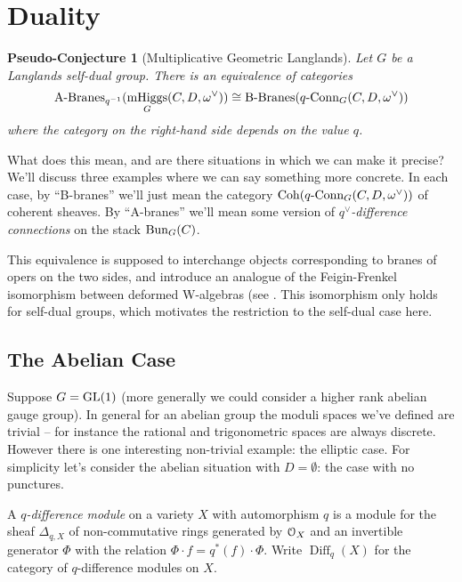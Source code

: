 \documentclass[10pt, oneside]{article}
\DeclareMathOperator{\mhiggs}{mHiggs}
\newcommand{\qconn}{q\text{-Conn}}
\DeclareMathOperator{\diff}{Diff}
\newtheorem{pseudoconj}[definition]{Pseudo-Conjecture}
\begin{document}
\section{Duality}

\begin{pseudoconj}[Multiplicative Geometric Langlands] \label{multLanglands}
Let $G$ be a Langlands self-dual group.  There is an equivalence of categories
\[\text{A-Branes}_{q^{-1}}(\mhiggs_G(C,D,\omega^\vee)) \iso \text{B-Branes}(\qconn_G(C, D, \omega^\vee))\]
where the category on the right-hand side depends on the value $q$.
\end{pseudoconj}

What does this mean, and are there situations in which we can make it precise?  We'll discuss three examples where we can say something more concrete.  In each case, by ``B-branes'' we'll just mean the category $\coh(\qconn_G(C, D, \omega^\vee))$ of coherent sheaves.  By ``A-branes'' we'll mean some version of \emph{$q^\vee$-difference connections} on the stack $\operatorname{Bun}_G(C)$.

\begin{remark}
This equivalence is supposed to interchange objects corresponding to branes of opers on the two sides, and introduce an analogue of the Feigin-Frenkel isomorphism between deformed W-algebras (see \cite{FrenkelReshetikhinSTS, STSSevostyanov}.  This isomorphism only holds for self-dual groups, which motivates the restriction to the self-dual case here.
\end{remark}

\subsection{The Abelian Case}
Suppose $G = \mathrm{GL}(1)$ (more generally we could consider a higher rank abelian gauge group).  In general for an abelian group the moduli spaces we've defined are trivial -- for instance the rational and trigonometric spaces are always discrete.  However there is one interesting non-trivial example: the elliptic case.  For simplicity let's consider the abelian situation with $D = \emptyset$: the case with no punctures.

\begin{definition}
A \emph{$q$-difference module} on a variety $X$ with automorphism $q$ is a module for the sheaf $\Delta_{q,X}$ of non-commutative rings generated by $\mathcal{O}_X$ and an invertible generator $\Phi$ with the relation $\Phi \cdot f = q^*(f) \cdot \Phi$.  Write $\diff_q(X)$ for the category of $q$-difference modules on $X$.
\end{definition}
\end{document}
